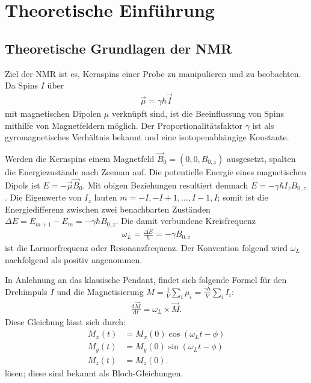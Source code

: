 \chapter{Theoretische Einführung}
\label{chapter:theo}

\section{Theoretische Grundlagen der NMR} \label{section:theo:grundlagen}


Ziel der NMR ist es, Kernspins einer Probe zu manipulieren und zu beobachten.
Da Spins $I$ über
\begin{align}
    \vec{\mu} = \gamma \hbar \vec{I}
\end{align}
mit magnetischen Dipolen $\mu$ verknüpft sind, ist die Beeinflussung von Spins mithilfe von Magnetfeldern möglich. Der Proportionalitätsfaktor $\gamma$ ist als gyromagnetisches Verhältnis bekannt und eine isotopenabhängige Konstante.

Werden die Kernspins einem Magnetfeld $\vec{B}_0 = (0, 0, B_{0,z})$ ausgesetzt, spalten die Energiezustände nach Zeeman auf. Die potentielle Energie eines magnetischen Dipols ist $E = - \vec{\mu} \vec{B}_0$. Mit obigen Beziehungen resultiert demnach $E = - \gamma \hbar I_z B_{0,z}$. Die Eigenwerte von $I_z$ lauten $m = -I, -I + 1, \dots, I - 1, I$; somit ist die Energiedifferenz zwischen zwei benachbarten Zuständen $\Delta E = E_{m+1} - E_{m} = - \gamma \hbar B_{0,z}$. Die damit verbundene Kreisfrequenz
\begin{align}
    \omega_L = \frac{\Delta E}{\hbar} = - \gamma B_{0,z} \label{eqn:lamorfrequenz}
\end{align}
ist die Larmorfrequenz oder Resonanzfrequenz. Der Konvention folgend wird $\omega_L$ nachfolgend als positiv angenommen.



In Anlehnung an das klassische Pendant, findet sich folgende Formel für den Drehimpuls $I$ und die Magnetisierung $M = \frac{1}{V} \sum_i \mu_i = \frac{\gamma \hbar}{V} \sum_i I_i$:
\begin{align}
    \frac{\text{d}\vec{M}}{\text{d}t} = \omega_L \times \vec{M}. \label{eqn:drehmoment}
\end{align}
Diese Gleichung lässt sich durch:
\begin{align}
    M_x (t) &= M_x(0) \cos(\omega_L t - \phi) \\
    M_y (t) &= M_y(0) \sin(\omega_L t - \phi) \\
    M_z (t) &= M_z(0).
\end{align}
lösen; diese sind bekannt als Bloch-Gleichungen.

